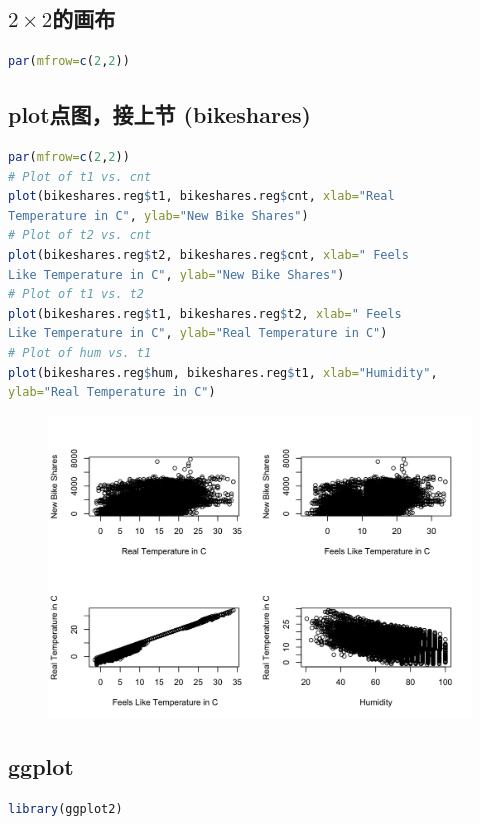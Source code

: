 \documentclass[11pt,a4paper]{article}
\begin{document}
\subsection{$2\times2$的画布}
\begin{lstlisting}[language=R]
par(mfrow=c(2,2))
\end{lstlisting}
\subsection{plot点图，接上节 (bikeshares)}
\begin{lstlisting}[language=R]
par(mfrow=c(2,2))
# Plot of t1 vs. cnt
plot(bikeshares.reg$t1, bikeshares.reg$cnt, xlab="Real
Temperature in C", ylab="New Bike Shares")
# Plot of t2 vs. cnt
plot(bikeshares.reg$t2, bikeshares.reg$cnt, xlab=" Feels
Like Temperature in C", ylab="New Bike Shares")
# Plot of t1 vs. t2
plot(bikeshares.reg$t1, bikeshares.reg$t2, xlab=" Feels
Like Temperature in C", ylab="Real Temperature in C")
# Plot of hum vs. t1
plot(bikeshares.reg$hum, bikeshares.reg$t1, xlab="Humidity",
ylab="Real Temperature in C")
\end{lstlisting}
\begin{center}\begin{figure}[htbp]
    \centering
    \includegraphics[scale=0.3]{Bike.png}
    \caption{}
    \label{}
\end{figure}\end{center}

\subsection{ggplot}
\begin{lstlisting}[language=R]
library(ggplot2)
\end{lstlisting}
\end{document}
